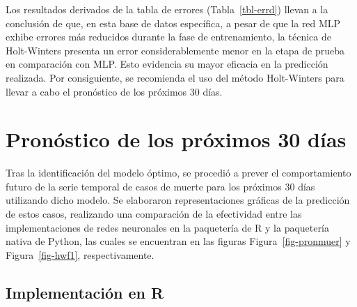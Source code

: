\documentclass[
  us-letterpaper,
]{scrreprt}
\newenvironment{Shaded}{\begin{snugshade}}{\end{snugshade}}
\newcommand{\AttributeTok}[1]{\textcolor[rgb]{0.40,0.45,0.13}{#1}}
\newcommand{\DecValTok}[1]{\textcolor[rgb]{0.68,0.00,0.00}{#1}}
\newcommand{\FunctionTok}[1]{\textcolor[rgb]{0.28,0.35,0.67}{#1}}
\newcommand{\NormalTok}[1]{\textcolor[rgb]{0.00,0.23,0.31}{#1}}
\newcommand{\OtherTok}[1]{\textcolor[rgb]{0.00,0.23,0.31}{#1}}
\newcommand{\SpecialCharTok}[1]{\textcolor[rgb]{0.37,0.37,0.37}{#1}}
\theoremstyle{plain}
\theoremstyle{definition}
\theoremstyle{definition}
\theoremstyle{plain}
\theoremstyle{remark}
\begin{document}
Los resultados derivados de la tabla de errores (Tabla~\ref{tbl-errd})
llevan a la conclusión de que, en esta base de datos específica, a pesar
de que la red MLP exhibe errores más reducidos durante la fase de
entrenamiento, la técnica de Holt-Winters presenta un error
considerablemente menor en la etapa de prueba en comparación con MLP.
Esto evidencia su mayor eficacia en la predicción realizada. Por
consiguiente, se recomienda el uso del método Holt-Winters para llevar a
cabo el pronóstico de los próximos 30 días.

\section{Pronóstico de los próximos 30
días}\label{pronuxf3stico-de-los-pruxf3ximos-30-duxedas-1}

Tras la identificación del modelo óptimo, se procedió a prever el
comportamiento futuro de la serie temporal de casos de muerte para los
próximos 30 días utilizando dicho modelo. Se elaboraron representaciones
gráficas de la predicción de estos casos, realizando una comparación de
la efectividad entre las implementaciones de redes neuronales en la
paquetería de R y la paquetería nativa de Python, las cuales se
encuentran en las figuras Figura~\ref{fig-pronmuer} y
Figura~\ref{fig-hwf1}, respectivamente.

\subsection{Implementación en R}\label{implementaciuxf3n-en-r-1}

\begin{Shaded}
\end{Shaded}
\end{document}
